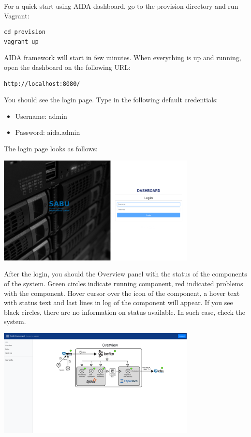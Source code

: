 \documentclass[a4paper]{article} %
\begin{document}
For a quick start using AIDA dashboard, go to the provision directory and run Vagrant:

\begin{lstlisting}[]
cd provision
vagrant up
\end{lstlisting}

AIDA framework will start in few minutes. When everything is up and running, open the dashboard on the following URL:

\begin{lstlisting}[]
http://localhost:8080/
\end{lstlisting}

You should see the login page. Type in the following default credentials:
\begin{itemize}[noitemsep,nolistsep]
  \item[] Username: admin
  \item[] Password: aida.admin
\end{itemize}
The login page looks as follows:

\includegraphics[width=0.75\textwidth]{fig/dashboard_login}

After the login, you should the Overview panel with the status of the components of the system. Green circles indicate running component, red indicated problems with the component. Hover cursor over the icon of the component, a hover text with status text and last lines in log of the component will appear. If you see black circles, there are no information on status available. In such case, check the system.

\includegraphics[width=0.75\textwidth]{fig/dashboard_overview}
\end{document}
